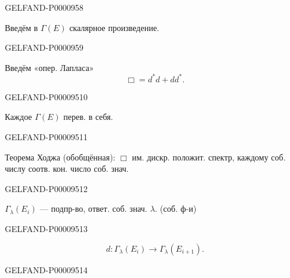 \begin{GelfandAdjacentEvidence}{GELFAND-P000095}{8}

Введём в $\Gamma(E)$ скалярное произведение.
\end{GelfandAdjacentEvidence}
\begin{GelfandAdjacentEvidence}{GELFAND-P000095}{9}

Введём «опер. Лапласа»
\begin{equation*}\Box=d^*d+dd^*.\end{equation*}
\end{GelfandAdjacentEvidence}
\begin{GelfandAdjacentEvidence}{GELFAND-P000095}{10}

Каждое $\Gamma(E)$ перев. в себя.
\end{GelfandAdjacentEvidence}
\begin{GelfandAdjacentEvidence}{GELFAND-P000095}{11}

Теорема Ходжа (обобщённая): $\Box$ им. дискр. положит.
спектр, каждому соб. числу соотв. кон. число соб. знач.
\end{GelfandAdjacentEvidence}
\begin{GelfandAdjacentEvidence}{GELFAND-P000095}{12}

$\Gamma_\lambda(E_i)$ — подпр-во, ответ. соб. знач. $\lambda$. (соб. ф-и)
\end{GelfandAdjacentEvidence}
\begin{GelfandAdjacentEvidence}{GELFAND-P000095}{13}

\begin{equation*}d:\Gamma_\lambda(E_i)\longrightarrow\Gamma_\lambda(E_{i+1}).\end{equation*}
\end{GelfandAdjacentEvidence}
\begin{GelfandAdjacentEvidence}{GELFAND-P000095}{14}

\begin{center}
\end{center}
\end{GelfandAdjacentEvidence}
